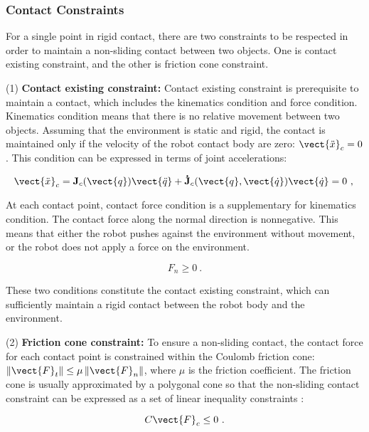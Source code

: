 \subsubsection{Contact Constraints}
For a single point in rigid contact, there are two constraints to be respected in order to maintain a non-sliding contact between two objects. One is contact existing constraint, and the other is friction cone constraint.

(1) \textbf{Contact existing constraint:} Contact existing constraint is prerequisite to maintain a contact, which includes the kinematics condition and force condition. Kinematics condition means that there is no relative movement between two objects. Assuming that the environment is static and rigid, the contact is maintained only if the velocity of the robot contact body are zero: $\vect{\ddot{x}}_c = 0$. This condition can be expressed in terms of joint accelerations:
\begin{singlespace}
\begin{equation}
\vect{\ddot{x}}_c=\mathbf{J}_c(\vect{q})\vect{\ddot{q}} + \mathbf{\dot{J}}_c(\vect{q},\vect{\dot{q}})\vect{\dot{q}}=0 ~, \label{eq:cons zero velocity}\\
\end{equation}
\end{singlespace}
\noindent At each contact point, contact force condition is a supplementary for kinematics condition. The contact force along the normal direction is nonnegative. This means that either the robot pushes against the environment without movement, or the robot does not apply a force on the environment.
\begin{singlespace}
\begin{equation}
F_n  \geq 0 ~. \label{eq:cons nonnegative force}
\end{equation}
\end{singlespace}
\noindent These two conditions constitute the contact existing constraint, which can sufficiently maintain a rigid contact between the robot body and the environment.

(2) \textbf{Friction cone constraint:} To ensure a non-sliding contact, the contact force for each contact point is constrained within the Coulomb friction cone: $\left\|\vect{F}_t\right\|  \leq \mu  \left\|\vect{F}_n \right\|$, where $\mu$ is the friction coefficient. The friction cone is usually approximated by a polygonal cone so that the non-sliding contact constraint can be expressed as a set of linear inequality constraints \cite{siciliano2008}: 
\begin{singlespace}
\begin{equation}\label{eq:cons friction cone}
C \vect{F}_c \leq 0 ~.
\end{equation}
\end{singlespace}


